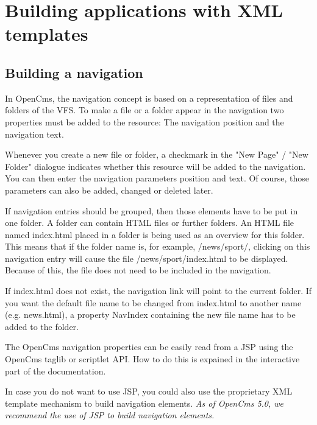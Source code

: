 \chapter{Building applications with XML templates}

\section{Building a navigation}

In OpenCms, the navigation concept is based on a representation of files and
folders of the VFS. To make a file or a folder appear 
in the navigation two properties must be added to the resource: 
The navigation position and the navigation text.

Whenever you create a new file or folder, a checkmark in the 
"New Page" / "New Folder" dialogue indicates whether this 
resource will be added to the navigation. You can then enter the 
navigation parameters position and text. Of course, those 
parameters can also be added, changed or deleted later.

If navigation entries should be grouped, then those elements have 
to be put in one folder. A folder can contain HTML files or 
further folders. An HTML file named index.html placed in a folder 
is being used as an overview for this folder. This means that if 
the folder name is, for example, {\dir /news/sport/}, clicking 
on this navigation entry will cause the file {\dir /news/sport/index.html} 
to be displayed. Because of this, the file does not need to be
included in the navigation.

If index.html does not exist, the navigation link will point to
the current folder. If you want the default file name to be changed
from index.html to another name (e.g. news.html), a property 
{\name NavIndex} containing the new file name has to be added to
the folder.

The OpenCms navigation properties can be easily read from a JSP 
using the OpenCms taglib or scriptlet API. 
How to do this is expained in the interactive part of the documentation.

In case you do not want to use JSP, you could also use the proprietary 
XML template mechanism to build navigation elements. 
{\em As of OpenCms 5.0, we recommend the use of JSP to build navigation elements.}

